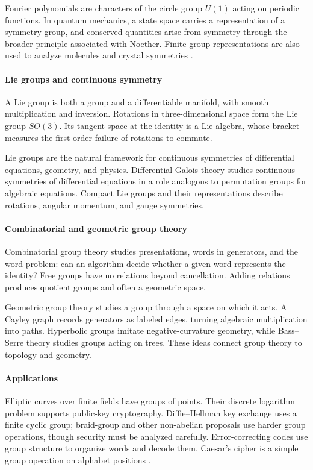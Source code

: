 Fourier polynomials are characters of the circle group $U(1)$ acting on periodic functions. In quantum mechanics, a state space carries a representation of a symmetry group, and conserved quantities arise from symmetry through the broader principle associated with Noether. Finite-group representations are also used to analyze molecules and crystal symmetries \cite{group_theory_ref3}.

\paragraph{Lie groups and continuous symmetry}
A Lie group is both a group and a differentiable manifold, with smooth multiplication and inversion. Rotations in three-dimensional space form the Lie group $SO(3)$. Its tangent space at the identity is a Lie algebra, whose bracket measures the first-order failure of rotations to commute.

Lie groups are the natural framework for continuous symmetries of differential equations, geometry, and physics. Differential Galois theory studies continuous symmetries of differential equations in a role analogous to permutation groups for algebraic equations. Compact Lie groups and their representations describe rotations, angular momentum, and gauge symmetries.

\paragraph{Combinatorial and geometric group theory}
Combinatorial group theory studies presentations, words in generators, and the word problem: can an algorithm decide whether a given word represents the identity? Free groups have no relations beyond cancellation. Adding relations produces quotient groups and often a geometric space.

Geometric group theory studies a group through a space on which it acts. A Cayley graph records generators as labeled edges, turning algebraic multiplication into paths. Hyperbolic groups imitate negative-curvature geometry, while Bass--Serre theory studies groups acting on trees. These ideas connect group theory to topology and geometry.

\paragraph{Applications}
Elliptic curves over finite fields have groups of points. Their discrete logarithm problem supports public-key cryptography. Diffie--Hellman key exchange uses a finite cyclic group; braid-group and other non-abelian proposals use harder group operations, though security must be analyzed carefully. Error-correcting codes use group structure to organize words and decode them. Caesar's cipher is a simple group operation on alphabet positions \cite{group_theory_ref4}.

